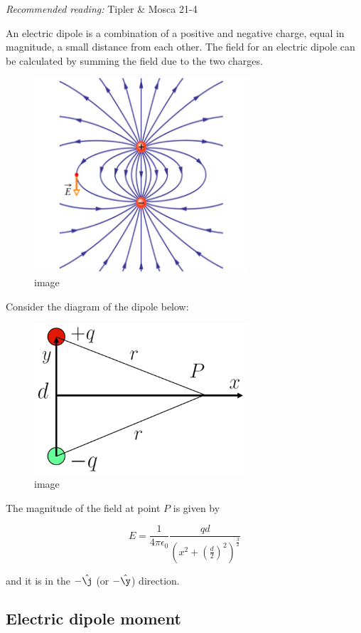 \documentclass[
]{book}
\begin{document}
\emph{Recommended reading:} Tipler \& Mosca 21-4

An electric dipole is a combination of a positive and negative charge,
equal in magnitude, a small distance from each other. The field for an
electric dipole can be calculated by summing the field due to the two
charges.

\begin{figure}
\centering
\includegraphics[width=80mm,height=\textheight]{Figures/dipole_field.png}
\caption{image}
\end{figure}

Consider the diagram of the dipole below:

\begin{figure}
\centering
\includegraphics[width=80mm,height=\textheight]{Figures/dipole_diagram.png}
\caption{image}
\end{figure}

The magnitude of the field at point \(P\) is given by

\[\label{eq:fieldatP}
E = \frac{1}{4 \pi \epsilon_0} \frac{qd}{\left( x^2 + \left( \frac{d}{2} \right)^2 \right)^{\frac{3}{2}}}\]

and it is in the \(-\hat{\j}\) (or \(-\hat{\y}\)) direction.

\hypertarget{electric-dipole-moment}{%
\subsection{Electric dipole moment}\label{electric-dipole-moment}}
\end{document}
